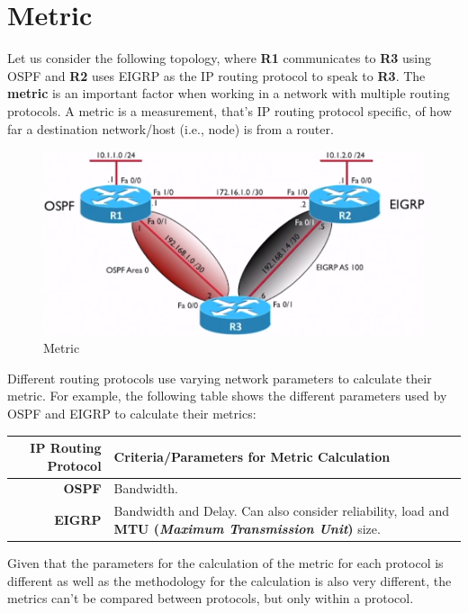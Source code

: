 \section{Metric}
Let us consider the following topology, where \textbf{R1} communicates to \textbf{R3} using OSPF and \textbf{R2} uses EIGRP as the IP routing protocol to speak to \textbf{R3}. The \textbf{metric} is an important factor when working in a network with multiple routing protocols. A metric is a measurement, that's IP routing protocol specific, of how far a destination network/host (i.e., node) is from a router. 

\begin{figure}[H]
\centering
\includegraphics[width=0.7\linewidth]{"ICND1/2. Routers/chapters/3.6.a Metric"}
\caption{Metric}
\label{fig:9.6.a}
\end{figure}
\vspace{-10pt}

\noindent
Different routing protocols use varying network parameters to calculate their metric. For example, the following table shows the different parameters used by OSPF and EIGRP to calculate their metrics: 

\vspace{-10pt}
\begin{center}
	\begin{tabular}{rm{}}
		\toprule
		\textbf{IP Routing Protocol} &\textbf{Criteria/Parameters for Metric Calculation} \\
		\midrule
		\textbf{OSPF}	&Bandwidth.\\
		\textbf{EIGRP}	&Bandwidth and Delay. Can also consider reliability, load and \textbf{MTU (\textit{Maximum Transmission Unit})} size.\\
		\bottomrule
	\end{tabular}
\end{center}
\vspace{-5pt}

\noindent
Given that the parameters for the calculation of the metric for each protocol is different as well as the methodology for the calculation is also very different, the metrics can't be compared between protocols, but only within a protocol. 

